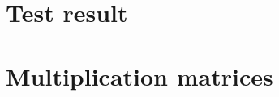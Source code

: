\documentclass[11pt,landscape]{article}
\begin{document}
\pagestyle{empty}
\begin{center}
\section*{\huge{Test result}}
\section*{Multiplication matrices}
\end{center}


\end{document}
